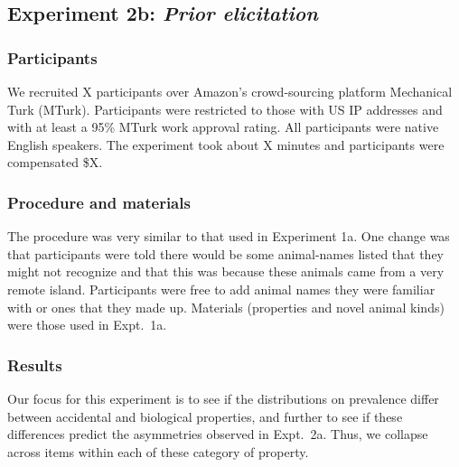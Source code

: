 \documentclass[10pt,letterpaper]{article}
\begin{document}
\subsection{Experiment 2b: \emph{Prior elicitation}}


\subsubsection{Participants}

We recruited X participants over Amazon's crowd-sourcing platform Mechanical Turk (MTurk).  Participants were restricted to those with US IP addresses and with at least a 95\% MTurk work approval rating. All participants were native English speakers. The experiment took about X minutes and participants were compensated \$X.

\subsubsection{Procedure and materials}

The procedure was very similar to that used in Experiment 1a. One change was that participants were told there would be some animal-names listed that they might not recognize and that this was because these animals came from a very remote island. Participants were free to add animal names they were familiar with or ones that they made up. Materials (properties and novel animal kinds) were those used in Expt.~1a.

\subsubsection{Results}

Our focus for this experiment is to see if the distributions on prevalence differ between accidental and biological properties, and further to see if these differences predict the asymmetries observed in Expt.~2a. Thus, we collapse across items within each of these category of property. 
\end{document}
